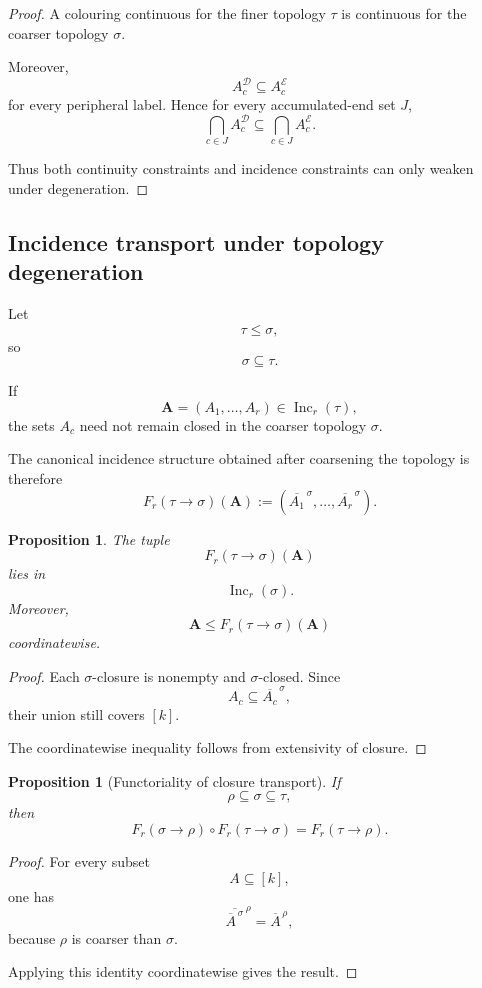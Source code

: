 \documentclass[11pt]{article}
\theoremstyle{plain}
\newtheorem{proposition}[theorem]{Proposition}
\theoremstyle{definition}
\begin{document}
\begin{proof}
A colouring continuous for the finer topology $\tau$ is continuous for
the coarser topology $\sigma$.

Moreover,
\[
A_c^{\mathcal D}
\subseteq
A_c^{\mathcal E}
\]
for every peripheral label.  Hence for every accumulated-end set $J$,
\[
\bigcap_{c\in J}
A_c^{\mathcal D}
\subseteq
\bigcap_{c\in J}
A_c^{\mathcal E}.
\]

Thus both continuity constraints and incidence constraints can only
weaken under degeneration.
\end{proof}


\subsection{Incidence transport under topology degeneration}
\label{subsec:incidence-transport-topology}

Let
\[
\tau\leq\sigma,
\]
so
\[
\sigma\subseteq\tau.
\]

If
\[
\mathbf A=(A_1,\ldots,A_r)
\in\operatorname{Inc}_r(\tau),
\]
the sets $A_c$ need not remain closed in the coarser topology $\sigma$.

The canonical incidence structure obtained after coarsening the topology
is therefore
\[
F_r(\tau\to\sigma)(\mathbf A)
:=
\left(
\overline{A_1}^{\,\sigma},
\ldots,
\overline{A_r}^{\,\sigma}
\right).
\]

\begin{proposition}
\label{prop:closure-incidence-map}
The tuple
\[
F_r(\tau\to\sigma)(\mathbf A)
\]
lies in
\[
\operatorname{Inc}_r(\sigma).
\]
Moreover,
\[
\mathbf A
\leq
F_r(\tau\to\sigma)(\mathbf A)
\]
coordinatewise.
\end{proposition}

\begin{proof}
Each $\sigma$-closure is nonempty and $\sigma$-closed.  Since
\[
A_c\subseteq
\overline{A_c}^{\,\sigma},
\]
their union still covers $[k]$.

The coordinatewise inequality follows from extensivity of closure.
\end{proof}

\begin{proposition}[Functoriality of closure transport]
\label{prop:closure-transport-functorial}
If
\[
\rho\subseteq\sigma\subseteq\tau,
\]
then
\[
F_r(\sigma\to\rho)
\circ
F_r(\tau\to\sigma)
=
F_r(\tau\to\rho).
\]
\end{proposition}

\begin{proof}
For every subset
\[
A\subseteq[k],
\]
one has
\[
\overline{
\overline A^{\,\sigma}
}^{\,\rho}
=
\overline A^{\,\rho},
\]
because $\rho$ is coarser than $\sigma$.

Applying this identity coordinatewise gives the result.
\end{proof}
\end{document}
